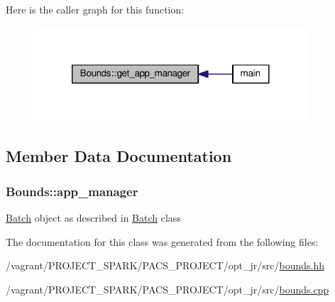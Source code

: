 Here is the caller graph for this function\-:\nopagebreak
\begin{figure}[H]
\begin{center}
\leavevmode
\includegraphics[width=288pt]{classBounds_aefebbfe17ca3a7d6a0f6cbf4a0bf2782_icgraph}
\end{center}
\end{figure}




\subsection{Member Data Documentation}
\hypertarget{classBounds_a9b463c00e877b6bf67d9e1ff4f36950b}{
\subsubsection[{app\-\_\-manager}]{ Bounds\-::app\-\_\-manager\hspace{0.3cm}{\ttfamily [private]}}}\label{classBounds_a9b463c00e877b6bf67d9e1ff4f36950b}
\hyperlink{classBatch}{Batch} object as described in \hyperlink{classBatch}{Batch} class 

The documentation for this class was generated from the following files\-:\begin{DoxyCompactItemize}
\item 
/vagrant/\-P\-R\-O\-J\-E\-C\-T\-\_\-\-S\-P\-A\-R\-K/\-P\-A\-C\-S\-\_\-\-P\-R\-O\-J\-E\-C\-T/opt\-\_\-jr/src/\hyperlink{bounds_8hh}{bounds.\-hh}\item 
/vagrant/\-P\-R\-O\-J\-E\-C\-T\-\_\-\-S\-P\-A\-R\-K/\-P\-A\-C\-S\-\_\-\-P\-R\-O\-J\-E\-C\-T/opt\-\_\-jr/src/\hyperlink{bounds_8cpp}{bounds.\-cpp}\end{DoxyCompactItemize}
